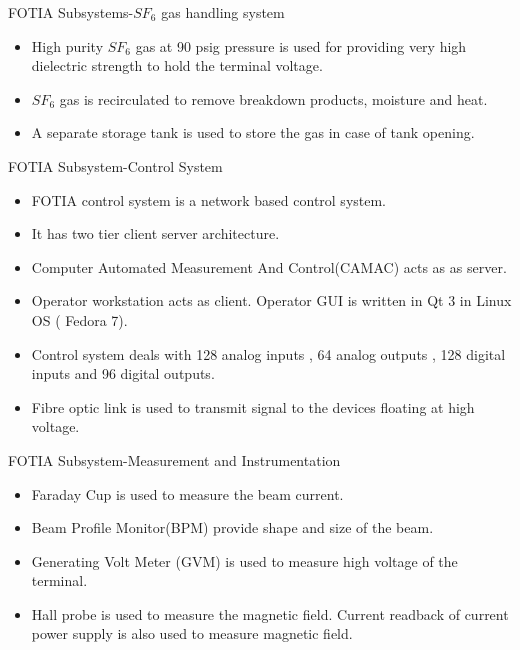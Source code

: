 \documentclass[11pt]{beamer}
\begin{document}
\begin{frame}{FOTIA Subsystems-$SF_{6}$ gas handling system}

  \begin{itemize}
      
    \item High purity $SF_{6}$ gas at 90 psig pressure is used for providing very high dielectric strength to hold the terminal voltage.
    \item $SF_{6}$ gas is recirculated to remove breakdown products, moisture and heat. 
    \item A separate storage tank is used to store the gas in case of tank opening.            
   \end{itemize}

\end{frame}



\begin{frame}{FOTIA Subsystem-Control System}

  \begin{itemize}
      
    \item FOTIA control system is a network based control system.
    \item It has two tier client server architecture.
    \item Computer Automated Measurement And Control(CAMAC) acts as as server.
    \item Operator workstation acts as client. Operator GUI is written in Qt 3 in Linux OS ( Fedora 7).
    \item Control system deals with 128 analog inputs , 64 analog outputs , 128 digital inputs and 96 digital outputs.
    \item Fibre optic link is used to transmit signal to the devices floating at high voltage.
      
           
   \end{itemize}

\end{frame}


\begin{frame}{FOTIA Subsystem-Measurement and Instrumentation}

  \begin{itemize}
      
    \item Faraday Cup is used to measure the beam current.
    \item Beam Profile Monitor(BPM) provide shape and size of the beam.
    \item Generating Volt Meter (GVM) is used to measure high voltage of the terminal.
    \item Hall probe is used to measure the magnetic field. Current readback of current power supply is also used to measure magnetic field.         
   \end{itemize}

\end{frame}
\end{document}
